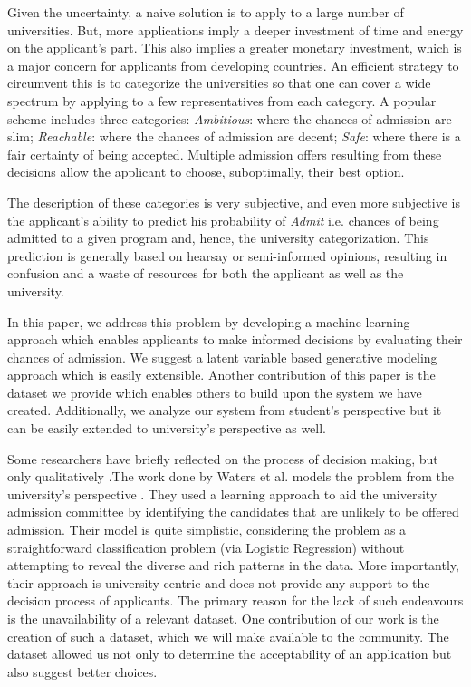 \documentclass{sig-alternate-05-2015}
\begin{document}
Given the uncertainty, a naive solution is to apply to a large number of universities. But, more applications imply a deeper investment of time and energy on the applicant's part. This also implies a greater monetary investment, which is a major concern for applicants from developing countries. An efficient strategy to circumvent this is to categorize the universities so that one can cover a wide spectrum by applying to a few representatives from each category. A popular scheme includes three categories: \textit{Ambitious}: where the chances of admission are slim; \textit{Reachable}: where the chances of admission are decent; \textit{Safe}: where there is a fair certainty of being accepted. Multiple admission offers resulting from these decisions allow the applicant to choose, suboptimally, their best option.

The description of these categories is very subjective, and even more subjective is the applicant's ability to predict his probability of \textit{Admit} i.e. chances of being admitted to a given program and, hence, the university categorization. This prediction is generally based on hearsay or semi-informed opinions, resulting in confusion and a waste of resources for both the applicant as well as the university. 

In this paper, we address this problem by developing a machine learning approach which enables applicants to make informed decisions by evaluating their chances of admission. We suggest a latent variable based generative modeling approach which is easily extensible. Another contribution of this paper is the dataset we provide which enables others to build upon the system we have created. Additionally, we analyze our system from student's perspective but it can be easily extended to university's perspective as well.

Some researchers have briefly reflected on the process of decision making, but only qualitatively \cite{dagap}.The work done by Waters et al. models the problem from the university's perspective \cite{waters:iaai13}. They used a learning approach to aid the university admission committee by identifying the candidates that are unlikely to be offered admission. Their model is quite simplistic, considering the problem as a straightforward classification problem (via Logistic Regression) without attempting to reveal the diverse and rich patterns in the data. More importantly, their approach is university centric and does not provide any support to the decision process of applicants. The primary reason for the lack of such endeavours is the unavailability of a relevant dataset. One contribution of our work is the creation of such a dataset, which we will make available to the community. The dataset allowed us not only to determine the acceptability of an application but also suggest better choices.
\end{document}
